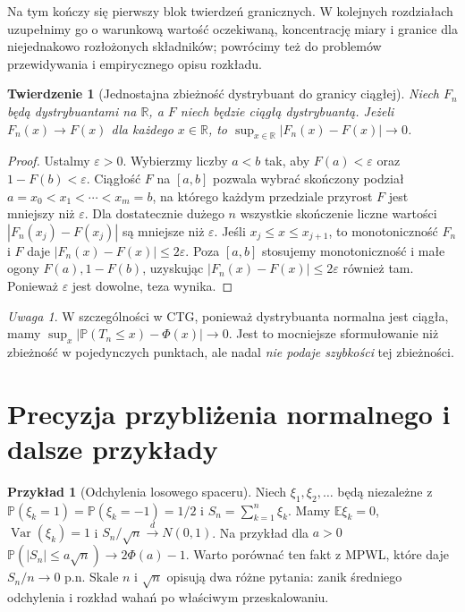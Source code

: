 \documentclass[11pt,a4paper,oneside]{report}
\numberwithin{equation}{chapter}
\theoremstyle{plain}
\newtheorem{twierdzenie}{Twierdzenie}[chapter]
\theoremstyle{definition}
\newtheorem{przyklad}{Przykład}[chapter]
\theoremstyle{remark}
\newtheorem{uwaga}{Uwaga}[chapter]
\newcommand{\R}{\mathbb{R}}
\newcommand{\Prob}{\mathbb{P}}
\newcommand{\E}{\mathbb{E}}
\newcommand{\Var}{\operatorname{Var}}
\begin{document}
Na tym kończy się pierwszy blok twierdzeń granicznych.
W kolejnych rozdziałach uzupełnimy go o warunkową wartość
oczekiwaną, koncentrację miary i granice dla
niejednakowo rozłożonych składników; powrócimy też
do problemów przewidywania i empirycznego opisu rozkładu.

\begin{twierdzenie}[Jednostajna zbieżność dystrybuant do granicy ciągłej]
Niech $F_n$ będą dystrybuantami na $\R$, a $F$
niech będzie \emph{ciągłą} dystrybuantą.
Jeżeli $F_n(x)\to F(x)$ dla każdego $x\in\R$,
to $\sup_{x\in\R}|F_n(x)-F(x)|\to0$.
\end{twierdzenie}
\begin{proof}
Ustalmy $\varepsilon>0$. Wybierzmy liczby $a<b$
tak, aby $F(a)<\varepsilon$ oraz
$1-F(b)<\varepsilon$. Ciągłość $F$ na $[a,b]$
pozwala wybrać skończony podział
$a=x_0<x_1<\cdots<x_m=b$, na którego
każdym przedziale przyrost $F$ jest mniejszy
niż $\varepsilon$. Dla dostatecznie dużego $n$
wszystkie skończenie liczne wartości
$|F_n(x_j)-F(x_j)|$ są mniejsze niż $\varepsilon$.
Jeśli $x_j\leq x\leq x_{j+1}$,
to monotoniczność $F_n$ i $F$ daje
$|F_n(x)-F(x)|\leq2\varepsilon$.
Poza $[a,b]$ stosujemy monotoniczność
i małe ogony $F(a),1-F(b)$, uzyskując
$|F_n(x)-F(x)|\leq2\varepsilon$ również tam.
Ponieważ $\varepsilon$ jest dowolne, teza wynika.
\end{proof}

\begin{uwaga}
W szczególności w CTG, ponieważ dystrybuanta
normalna jest ciągła, mamy
$\sup_x|\Prob(T_n\leq x)-\Phi(x)|\to0$.
Jest to mocniejsze sformułowanie niż zbieżność
w pojedynczych punktach, ale nadal \emph{nie podaje
szybkości} tej zbieżności.
\end{uwaga}

\section{Precyzja przybliżenia normalnego i dalsze przykłady}

\begin{przyklad}[Odchylenia losowego spaceru]
Niech $\xi_1,\xi_2,\ldots$ będą niezależne z
$\Prob(\xi_k=1)=\Prob(\xi_k=-1)=1/2$ i
$S_n=\sum_{k=1}^n\xi_k$. Mamy $\E\xi_k=0$,
$\Var(\xi_k)=1$ i $S_n/\sqrt n\xrightarrow d N(0,1)$.
Na przykład dla $a>0$
$\Prob(|S_n|\leq a\sqrt n)\to2\Phi(a)-1$.
Warto porównać ten fakt z MPWL, które daje
$S_n/n\to0$ p.n. Skale $n$ i $\sqrt n$ opisują
dwa różne pytania: zanik średniego odchylenia
i rozkład wahań po właściwym przeskalowaniu.
\end{przyklad}
\end{document}
